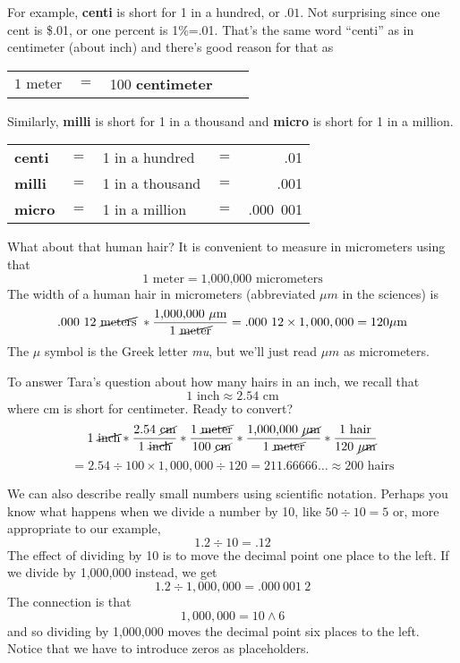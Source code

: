 For example, \textbf{centi} is short for 1 in a hundred, or $.01$.  Not surprising since one cent is \$.01, or one percent is 1\%=.01.  That's the same word ``centi'' as in centimeter (about  inch) and there's good reason for that as
\begin{center}
\begin{tabular} {lclcr} 
$ \text{1 meter}$&$=$&100 \textbf{centimeter} \\
\end{tabular}
\end{center}
Similarly, \textbf{milli} is short for 1 in a thousand and \textbf{micro} is short for 1 in a million.
\begin{center}
\begin{tabular} {lclcr} 
\textbf{centi} &$=$&1 in a hundred &$=$&.01\\
\textbf{milli} &$=$&1 in a thousand &$=$&.001\\
\textbf{micro} &$=$&1 in a million &$=$&.000~001\\
\end{tabular}
\end{center}


What about that human hair?  It is convenient to measure in micrometers
using that $$1 \text{ meter} = \text{1,000,000 micrometers} $$
The width of a human hair in micrometers (abbreviated $\mu m$ in the sciences) is
$$.000~12 \text{ \cancel{meters} } \ast \frac{\text{1,000,000 } \mu \text{m}}{1 \text{ \cancel{meter}}} =  .000~12 \times 1,000,000 = 120 \mu \text{m}$$
The $\mu$ symbol is the Greek letter {\it mu}, but we'll just read $\mu m$ as micrometers.  

To answer Tara's question about how many hairs in an inch, we recall that 
$$1 \text{ inch} \approx 2.54 \text{ cm}$$
where cm is short for centimeter.  Ready to convert?
$$ 1 \text{ \cancel{inch}} \ast \frac{ 2.54 \text{ \cancel{cm}} }{1 \text{ \cancel{inch}}}
\ast \frac{1 \text{ \cancel{meter}}}{100 \text{ \cancel{cm}}} 
\ast \frac{\text{1,000,000  \cancel{$\mu$m}}}{1 \text{ \cancel{meter}}} 
\ast \frac{1 \text{ hair}}{120 \text{ \cancel{$\mu$m}}}$$ 
$$ = 2.54 \div 100 \times 1,000,000 \div 120 = 211.66666\ldots \approx 200 \text{ hairs}$$

We can also describe really small numbers using scientific notation.  Perhaps you know what happens when we divide a number by 10, like
$ 50 \div 10 = 5$ or, more appropriate to our example, $$ 1.2 \div 10 = .12$$
The effect of dividing by 10 is to move the decimal point one place to the left.
If we divide by 1,000,000 instead, we get
$$ 1.2 \div 1,000,000 = .000~001~2 $$ 
The connection is that $$ 1,000,000 = 10 \wedge 6  $$
and so dividing by 1,000,000 moves the decimal point six places to the left.  Notice that we have to introduce zeros as placeholders.


